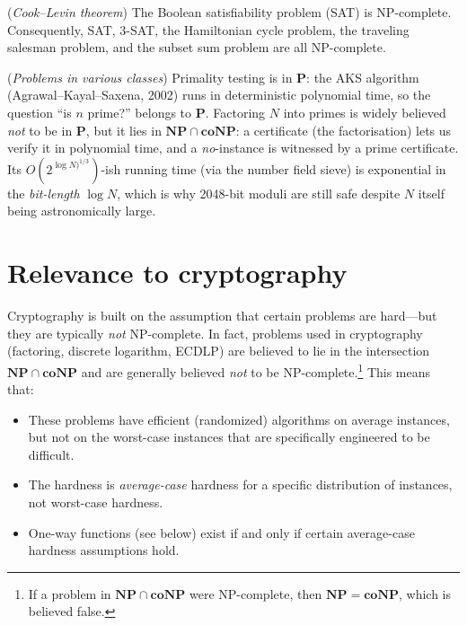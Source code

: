 \documentclass[a4paper, 12pt]{book} %
\begin{document}
\begin{theorem}
    (\emph{Cook--Levin theorem}) The Boolean satisfiability problem (SAT) is NP-complete. Consequently, SAT, 3-SAT, the Hamiltonian cycle problem, the traveling salesman problem, and the subset sum problem are all NP-complete.
\end{theorem}

\begin{example}
    (\emph{Problems in various classes}) Primality testing is in \textbf{P}: the AKS algorithm (Agrawal--Kayal--Saxena, 2002) runs in deterministic polynomial time, so the question ``is $n$ prime?'' belongs to \textbf{P}. Factoring $N$ into primes is widely believed \emph{not} to be in \textbf{P}, but it lies in $\mathbf{NP} \cap \mathbf{coNP}$: a certificate (the factorisation) lets us verify it in polynomial time, and a \emph{no}-instance is witnessed by a prime certificate. Its $O(2^{\log N)^{1/3}})$-ish running time (via the number field sieve) is exponential in the \emph{bit-length} $\log N$, which is why 2048-bit moduli are still safe despite $N$ itself being astronomically large.
\end{example}

\section{Relevance to cryptography}

\begin{remark}
    Cryptography is built on the assumption that certain problems are hard---but they are typically \emph{not} NP-complete. In fact, problems used in cryptography (factoring, discrete logarithm, ECDLP) are believed to lie in the intersection $\mathbf{NP} \cap \mathbf{coNP}$ and are generally believed \emph{not} to be NP-complete.\footnote{If a problem in $\mathbf{NP} \cap \mathbf{coNP}$ were NP-complete, then $\mathbf{NP} = \mathbf{coNP}$, which is believed false.} This means that:
    \begin{itemize}
        \item These problems have efficient (randomized) algorithms on average instances, but not on the worst-case instances that are specifically engineered to be difficult.
        \item The hardness is \emph{average-case} hardness for a specific distribution of instances, not worst-case hardness.
        \item One-way functions (see below) exist if and only if certain average-case hardness assumptions hold.
    \end{itemize}
\end{remark}
\end{document}
